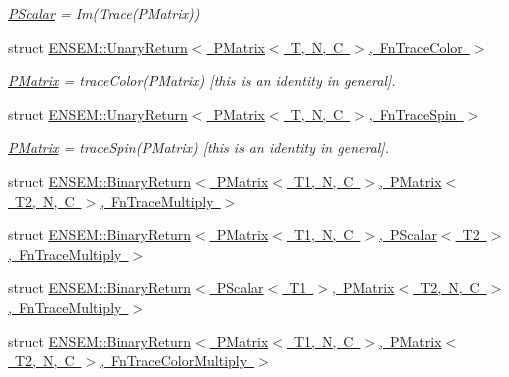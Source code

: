 \begin{DoxyCompactItemize}
\begin{DoxyCompactList}\small\item\em \mbox{\hyperlink{classENSEM_1_1PScalar}{P\+Scalar}} = Im(\+Trace(\+P\+Matrix)) \end{DoxyCompactList}\item 
struct \mbox{\hyperlink{structENSEM_1_1UnaryReturn_3_01PMatrix_3_01T_00_01N_00_01C_01_4_00_01FnTraceColor_01_4}{E\+N\+S\+E\+M\+::\+Unary\+Return$<$ P\+Matrix$<$ T, N, C $>$, Fn\+Trace\+Color $>$}}
\begin{DoxyCompactList}\small\item\em \mbox{\hyperlink{classENSEM_1_1PMatrix}{P\+Matrix}} = trace\+Color(\+P\+Matrix) \mbox{[}this is an identity in general\mbox{]}. \end{DoxyCompactList}\item 
struct \mbox{\hyperlink{structENSEM_1_1UnaryReturn_3_01PMatrix_3_01T_00_01N_00_01C_01_4_00_01FnTraceSpin_01_4}{E\+N\+S\+E\+M\+::\+Unary\+Return$<$ P\+Matrix$<$ T, N, C $>$, Fn\+Trace\+Spin $>$}}
\begin{DoxyCompactList}\small\item\em \mbox{\hyperlink{classENSEM_1_1PMatrix}{P\+Matrix}} = trace\+Spin(\+P\+Matrix) \mbox{[}this is an identity in general\mbox{]}. \end{DoxyCompactList}\item 
struct \mbox{\hyperlink{structENSEM_1_1BinaryReturn_3_01PMatrix_3_01T1_00_01N_00_01C_01_4_00_01PMatrix_3_01T2_00_01N_00_1d8da185d9b8e504049f8a2cb304a01d}{E\+N\+S\+E\+M\+::\+Binary\+Return$<$ P\+Matrix$<$ T1, N, C $>$, P\+Matrix$<$ T2, N, C $>$, Fn\+Trace\+Multiply $>$}}
\item 
struct \mbox{\hyperlink{structENSEM_1_1BinaryReturn_3_01PMatrix_3_01T1_00_01N_00_01C_01_4_00_01PScalar_3_01T2_01_4_00_01FnTraceMultiply_01_4}{E\+N\+S\+E\+M\+::\+Binary\+Return$<$ P\+Matrix$<$ T1, N, C $>$, P\+Scalar$<$ T2 $>$, Fn\+Trace\+Multiply $>$}}
\item 
struct \mbox{\hyperlink{structENSEM_1_1BinaryReturn_3_01PScalar_3_01T1_01_4_00_01PMatrix_3_01T2_00_01N_00_01C_01_4_00_01FnTraceMultiply_01_4}{E\+N\+S\+E\+M\+::\+Binary\+Return$<$ P\+Scalar$<$ T1 $>$, P\+Matrix$<$ T2, N, C $>$, Fn\+Trace\+Multiply $>$}}
\item 
struct \mbox{\hyperlink{structENSEM_1_1BinaryReturn_3_01PMatrix_3_01T1_00_01N_00_01C_01_4_00_01PMatrix_3_01T2_00_01N_00_d90c323b0eef8bf9c5abb3303bff0c7e}{E\+N\+S\+E\+M\+::\+Binary\+Return$<$ P\+Matrix$<$ T1, N, C $>$, P\+Matrix$<$ T2, N, C $>$, Fn\+Trace\+Color\+Multiply $>$}}

\end{DoxyCompactItemize}
